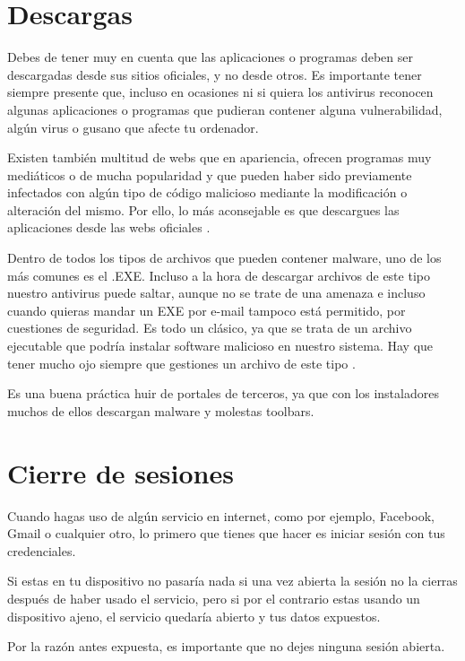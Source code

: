 \documentclass[
  a4paper,
  openany]{book}
\begin{document}
\hypertarget{descargas}{%
\section{Descargas}\label{descargas}}

Debes de tener muy en cuenta que las aplicaciones o programas deben ser descargadas desde sus sitios oficiales, y no desde otros. Es importante tener siempre presente que, incluso en ocasiones ni si quiera los antivirus reconocen algunas aplicaciones o programas que pudieran contener alguna vulnerabilidad, algún virus o gusano que afecte tu ordenador.

Existen también multitud de webs que en apariencia, ofrecen programas muy mediáticos o de mucha popularidad y que pueden haber sido previamente infectados con algún tipo de código malicioso mediante la modificación o alteración del mismo. Por ello, lo más aconsejable es que descargues las aplicaciones desde las webs oficiales \citep{software-alterado}.

Dentro de todos los tipos de archivos que pueden contener malware, uno de los más comunes es el .EXE. Incluso a la hora de descargar archivos de este tipo nuestro antivirus puede saltar, aunque no se trate de una amenaza e incluso cuando quieras mandar un EXE por e-mail tampoco está permitido, por cuestiones de seguridad. Es todo un clásico, ya que se trata de un archivo ejecutable que podría instalar software malicioso en nuestro sistema. Hay que tener mucho ojo siempre que gestiones un archivo de este tipo \citep{RZ-exe}.

Es una buena práctica huir de portales de terceros, ya que con los instaladores muchos de ellos descargan malware y molestas toolbars.

\hypertarget{cierre-de-sesiones}{%
\section{Cierre de sesiones}\label{cierre-de-sesiones}}

Cuando hagas uso de algún servicio en internet, como por ejemplo, Facebook, Gmail o cualquier otro, lo primero que tienes que hacer es iniciar sesión con tus credenciales.

Si estas en tu dispositivo no pasaría nada si una vez abierta la sesión no la cierras después de haber usado el servicio, pero si por el contrario estas usando un dispositivo ajeno, el servicio quedaría abierto y tus datos expuestos.

Por la razón antes expuesta, es importante que no dejes ninguna sesión abierta.
\end{document}
